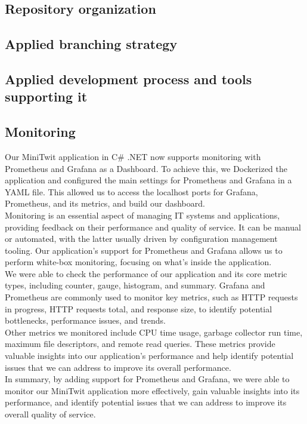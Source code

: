 \documentclass{article}
\begin{document}
\subsection{Repository organization}
\subsection{Applied branching strategy}
\subsection{Applied development process and tools supporting it}
\subsection{Monitoring}
Our MiniTwit application in C\# .NET now supports monitoring with Prometheus and Grafana as a Dashboard. To achieve this, we Dockerized the application and configured the main settings for Prometheus and Grafana in a YAML file. This allowed us to access the localhost ports for Grafana, Prometheus, and its metrics, and build our dashboard.\\
Monitoring is an essential aspect of managing IT systems and applications, providing feedback on their performance and quality of service. It can be manual or automated, with the latter usually driven by configuration management tooling. Our application's support for Prometheus and Grafana allows us to perform white-box monitoring, focusing on what's inside the application.\\
We were able to check the performance of our application and its core metric types, including counter, gauge, histogram, and summary. Grafana and Prometheus are commonly used to monitor key metrics, such as HTTP requests in progress, HTTP requests total, and response size, to identify potential bottlenecks, performance issues, and trends.\\
Other metrics we monitored include CPU time usage, garbage collector run time, maximum file descriptors, and remote read queries. These metrics provide valuable insights into our application's performance and help identify potential issues that we can address to improve its overall performance.\\
In summary, by adding support for Prometheus and Grafana, we were able to monitor our MiniTwit application more effectively, gain valuable insights into its performance, and identify potential issues that we can address to improve its overall quality of service.
\end{document}

